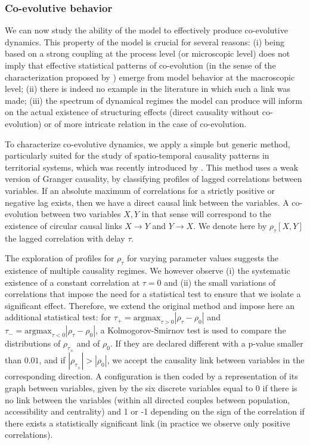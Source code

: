 \documentclass[11pt]{article}
\begin{document}
\subsubsection{Co-evolutive behavior}



We can now study the ability of the model to effectively produce co-evolutive dynamics. This property of the model is crucial for several reasons: (i) being based on a strong coupling at the process level (or microscopic level) does not imply that effective statistical patterns of co-evolution (in the sense of the characterization proposed by \cite{raimbault2018caracterisation}) emerge from model behavior at the macroscopic level; (ii) there is indeed no example in the literature in which such a link was made; (iii) the spectrum of dynamical regimes the model can produce will inform on the actual existence of structuring effects (direct causality without co-evolution) or of more intricate relation in the case of co-evolution.

To characterize co-evolutive dynamics, we apply a simple but generic method, particularly suited for the study of spatio-temporal causality patterns in territorial systems, which was recently introduced by \cite{raimbault2017identification}. This method uses a weak version of Granger causality, by classifying profiles of lagged correlations between variables. If an absolute maximum of correlations for a strictly positive or negative lag exists, then we have a direct causal link between the variables. A co-evolution between two variables $X,Y$ in that sense will correspond to the existence of circular causal links $X\rightarrow Y$ and $Y\rightarrow X$. We denote here by $\rho_{\tau}\left[X,Y\right]$ the lagged correlation with delay $\tau$.


The exploration of profiles for $\rho_\tau$ for varying parameter values suggests the existence of multiple causality regimes. We however observe (i) the systematic existence of a constant correlation at $\tau = 0$ and (ii) the small variations of correlations that impose the need for a statistical test to ensure that we isolate a significant effect. Therefore, we extend the original method and impose here an additional statistical test: for $\tau_+ = \textrm{argmax}_{\tau>0} \left|\rho_{\tau} - \rho_0\right|$ and $\tau_- = \textrm{argmax}_{\tau<0} \left|\rho_{\tau} - \rho_0\right|$, a Kolmogorov-Smirnov test is used to compare the distributions of $\rho_{\tau_{\pm}}$ and of $\rho_0$. If they are declared different with a p-value smaller than $0.01$, and if $\left|\rho_{\tau_{\pm}}\right| > \left|\rho_0\right|$, we accept the causality link between variables in the corresponding direction. A configuration is then coded by a representation of its graph between variables, given by the six discrete variables equal to 0 if there is no link between the variables (within all directed couples between population, accessibility and centrality) and 1 or -1 depending on the sign of the correlation if there exists a statistically significant link (in practice we observe only positive correlations).
\end{document}
